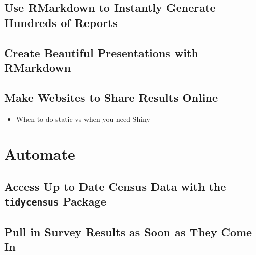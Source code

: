 \documentclass[
]{book}
\providecommand{\tightlist}{%
  \setlength{\itemsep}{0pt}\setlength{\parskip}{0pt}}
\begin{document}
\hypertarget{use-rmarkdown-to-instantly-generate-hundreds-of-reports}{%
\chapter*{Use RMarkdown to Instantly Generate Hundreds of Reports}\label{use-rmarkdown-to-instantly-generate-hundreds-of-reports}}

\hypertarget{create-beautiful-presentations-with-rmarkdown}{%
\chapter*{Create Beautiful Presentations with RMarkdown}\label{create-beautiful-presentations-with-rmarkdown}}

\hypertarget{make-websites-to-share-results-online}{%
\chapter*{Make Websites to Share Results Online}\label{make-websites-to-share-results-online}}

\begin{itemize}
\tightlist
\item
  When to do static vs when you need Shiny
\end{itemize}

\hypertarget{part-automate}{%
\part*{Automate}\label{part-automate}}

\hypertarget{access-up-to-date-census-data-with-the-tidycensus-package}{%
\chapter*{\texorpdfstring{Access Up to Date Census Data with the \texttt{tidycensus} Package}{Access Up to Date Census Data with the tidycensus Package}}\label{access-up-to-date-census-data-with-the-tidycensus-package}}

\hypertarget{pull-in-survey-results-as-soon-as-they-come-in}{%
\chapter*{Pull in Survey Results as Soon as They Come In}\label{pull-in-survey-results-as-soon-as-they-come-in}}
\end{document}
